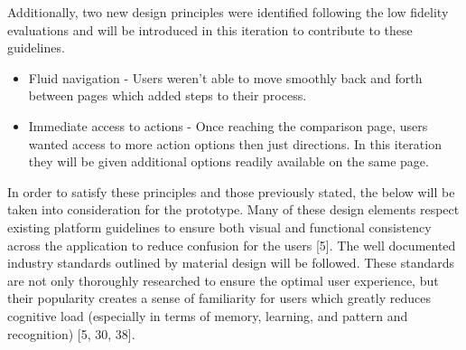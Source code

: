 \documentclass[a4 paper, 12pt]{article}
\begin{document}
    Additionally, two new design principles were identified following the low fidelity evaluations and will be introduced in this iteration to contribute to these guidelines. 
        \begin{itemize}
            \item Fluid navigation - Users weren't able to move smoothly back and forth between pages which added steps to their process. 
            \item Immediate access to actions - Once reaching the comparison page, users wanted access to more action options then just directions. In this iteration they will be given additional options readily available on the same page.
        \end{itemize}

    In order to satisfy these principles and those previously stated, the below will be taken into consideration for the prototype. Many of these design elements respect existing platform guidelines to ensure both visual and functional consistency across the application to reduce confusion for the users [5]. The well documented industry standards outlined by material design will be followed. These standards are not only thoroughly researched to ensure the optimal user experience, but their popularity creates a sense of familiarity for users which greatly reduces cognitive load (especially in terms of memory, learning, and pattern and recognition) [5, 30, 38]. 
\end{document}

